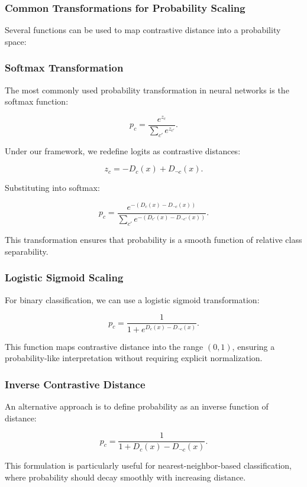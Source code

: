 \documentclass[12pt]{article}
\begin{document}
\subsubsection{Common Transformations for Probability Scaling}

Several functions can be used to map contrastive distance into a probability space:

\subsubsection{Softmax Transformation}

The most commonly used probability transformation in neural networks is the softmax function:

\[
p_c = \frac{e^{z_c}}{\sum_{c'} e^{z_{c'}}}.
\]

Under our framework, we redefine logits as contrastive distances:

\[
z_c = -D_c(x) + D_{\neg c}(x).
\]

Substituting into softmax:

\[
p_c = \frac{e^{-(D_c(x) - D_{\neg c}(x))}}{\sum_{c'} e^{-(D_{c'}(x) - D_{\neg c'}(x))}}.
\]

This transformation ensures that probability is a smooth function of relative class separability.

\subsubsection{Logistic Sigmoid Scaling}

For binary classification, we can use a logistic sigmoid transformation:

\[
p_c = \frac{1}{1 + e^{D_c(x) - D_{\neg c}(x)}}.
\]

This function maps contrastive distance into the range \( (0,1) \), ensuring a probability-like interpretation without requiring explicit normalization.

\subsubsection{Inverse Contrastive Distance}

An alternative approach is to define probability as an inverse function of distance:

\[
p_c = \frac{1}{1 + D_c(x) - D_{\neg c}(x)}.
\]

This formulation is particularly useful for nearest-neighbor-based classification, where probability should decay smoothly with increasing distance.
\end{document}
